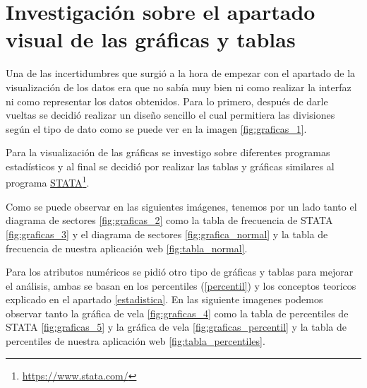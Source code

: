 \section{Investigación sobre el apartado visual de las gráficas y tablas}

Una de las incertidumbres que surgió a la hora de empezar con el apartado de la visualización de los datos era que no sabía muy bien ni como realizar la interfaz ni como representar los datos obtenidos. Para lo primero, después de darle vueltas se decidió realizar un diseño sencillo el cual permitiera las divisiones según el tipo de dato como se puede ver en la imagen \ref{fig:graficas_1}.  


Para la visualización de las gráficas se investigo sobre diferentes programas estadísticos y al final se decidió por realizar las tablas y gráficas similares al programa \href{https://www.stata.com/}{STATA}\footnote{\href{https://www.stata.com/}{https://www.stata.com/}}.

Como se puede observar en las siguientes imágenes, tenemos por un lado tanto el diagrama de sectores \ref{fig:graficas_2} como la tabla de frecuencia de STATA \ref{fig:graficas_3} y el diagrama de sectores \ref{fig:grafica_normal} y la tabla de frecuencia de nuestra aplicación web \ref{fig:tabla_normal}.


Para los atributos numéricos se pidió otro tipo de gráficas y tablas para mejorar el análisis, ambas se basan en los percentiles (\ref{percentil}) y los conceptos teoricos explicado en el apartado \ref{estadistica}. En las siguiente imagenes podemos observar tanto la gráfica de vela \ref{fig:graficas_4} como la tabla de percentiles de STATA \ref{fig:graficas_5} y la gráfica de vela \ref{fig:graficas_percentil} y la tabla de percentiles de nuestra aplicación web \ref{fig:tabla_percentiles}.


